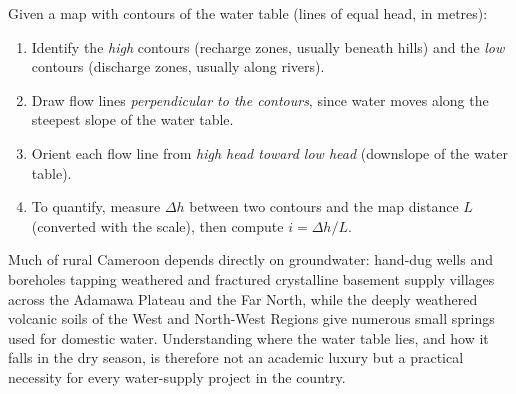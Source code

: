 \documentclass[11pt]{article}
\begin{document}
\begin{methode}
Given a map with contours of the water table (lines of equal head, in metres):
\begin{enumerate}
\item Identify the \emph{high} contours (recharge zones, usually beneath hills) and the \emph{low} contours (discharge zones, usually along rivers).
\item Draw flow lines \emph{perpendicular to the contours}, since water moves along the steepest slope of the water table.
\item Orient each flow line from \emph{high head toward low head} (downslope of the water table).
\item To quantify, measure $\Delta h$ between two contours and the map distance $L$ (converted with the scale), then compute $i = \Delta h / L$.
\end{enumerate}
\end{methode}

\begin{savaistu}
Much of rural Cameroon depends directly on groundwater: hand-dug wells and boreholes tapping weathered and fractured crystalline basement supply villages across the Adamawa Plateau and the Far North, while the deeply weathered volcanic soils of the West and North-West Regions give numerous small springs used for domestic water. Understanding where the water table lies, and how it falls in the dry season, is therefore not an academic luxury but a practical necessity for every water-supply project in the country.
\end{savaistu}
\end{document}
